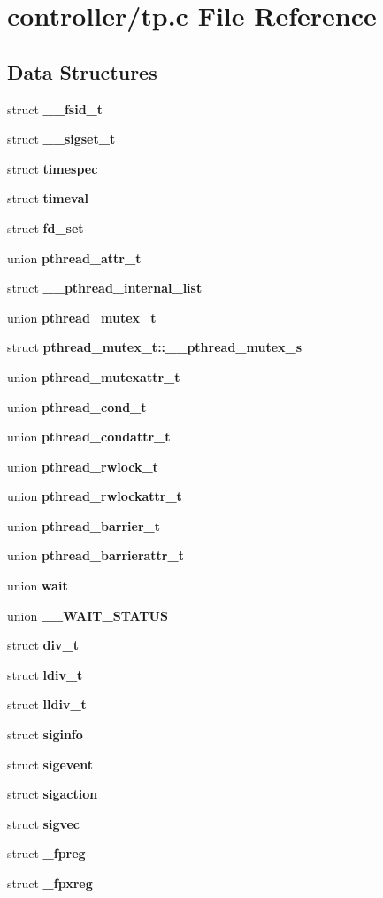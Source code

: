 \section{controller/tp.c File Reference}
\label{controller_2tp_8c}
\subsection*{Data Structures}
\begin{DoxyCompactItemize}
\item 
struct {\bf \_\-\_\-fsid\_\-t}
\item 
struct {\bf \_\-\_\-sigset\_\-t}
\item 
struct {\bf timespec}
\item 
struct {\bf timeval}
\item 
struct {\bf fd\_\-set}
\item 
union {\bf pthread\_\-attr\_\-t}
\item 
struct {\bf \_\-\_\-pthread\_\-internal\_\-list}
\item 
union {\bf pthread\_\-mutex\_\-t}
\item 
struct {\bf pthread\_\-mutex\_\-t::\_\-\_\-pthread\_\-mutex\_\-s}
\item 
union {\bf pthread\_\-mutexattr\_\-t}
\item 
union {\bf pthread\_\-cond\_\-t}
\item 
union {\bf pthread\_\-condattr\_\-t}
\item 
union {\bf pthread\_\-rwlock\_\-t}
\item 
union {\bf pthread\_\-rwlockattr\_\-t}
\item 
union {\bf pthread\_\-barrier\_\-t}
\item 
union {\bf pthread\_\-barrierattr\_\-t}
\item 
union {\bf wait}
\item 
union {\bf \_\-\_\-WAIT\_\-STATUS}
\item 
struct {\bf div\_\-t}
\item 
struct {\bf ldiv\_\-t}
\item 
struct {\bf lldiv\_\-t}
\item 
struct {\bf siginfo}
\item 
struct {\bf sigevent}
\item 
struct {\bf sigaction}
\item 
struct {\bf sigvec}
\item 
struct {\bf \_\-fpreg}
\item 
struct {\bf \_\-fpxreg}

\end{DoxyCompactItemize}
